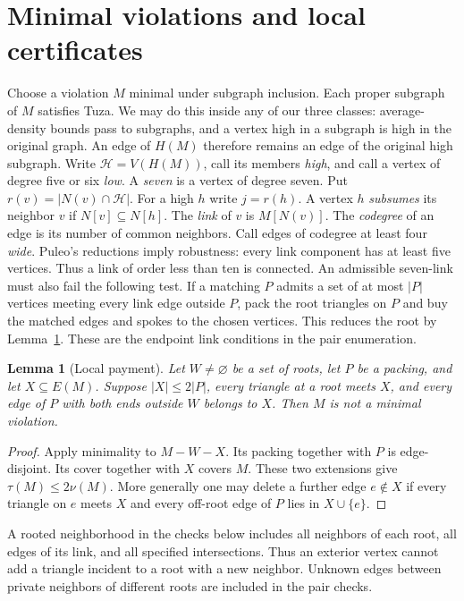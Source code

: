 \documentclass[11pt,a4paper]{amsart}
\newtheorem{lemma}[theorem]{Lemma}
\newcommand{\Hi}{\mathcal H}
\begin{document}
\section{Minimal violations and local certificates}\label{sec:local}
Choose a violation $M$ minimal under subgraph inclusion. Each proper
subgraph of $M$ satisfies Tuza. We may do this inside any of our
three classes: average-density bounds pass to subgraphs, and a
vertex high in a subgraph is high in the original graph. An edge
of $H(M)$ therefore remains an edge of the original high subgraph.
Write $\Hi=V(H(M))$, call its members \emph{high}, and call a vertex
of degree five or six \emph{low}. A \emph{seven} is a vertex of degree
seven. Put $r(v)=|N(v)\cap\Hi|$. For a high $h$ write $j=r(h)$.
A vertex $h$ \emph{subsumes} its neighbor $v$ if $N[v]\subseteq N[h]$.
The \emph{link} of $v$ is $M[N(v)]$. The \emph{codegree} of an edge
is its number of common neighbors. Call edges of codegree at least
four \emph{wide}. Puleo's reductions imply robustness: every link
component has at least five vertices. Thus a link of order less
than ten is connected. An admissible seven-link must also fail
the following test. If a matching $P$ admits a set of at most
$|P|$ vertices meeting every link edge outside $P$, pack the
root triangles on $P$ and buy the
matched edges and spokes to the chosen vertices. This reduces
the root by Lemma~\ref{lem:pay}. These are the endpoint link
conditions in the pair enumeration.

\begin{lemma}[Local payment]\label{lem:pay}
Let $W\ne\varnothing$ be a set of roots, let $P$ be a packing, and
let $X\subseteq E(M)$. Suppose $|X|\le2|P|$, every triangle at a
root meets $X$, and every edge of $P$ with both ends outside $W$
belongs to $X$. Then $M$ is not a minimal violation.
\end{lemma}
\begin{proof}
Apply minimality to $M-W-X$. Its packing together with $P$ is
edge-disjoint. Its cover together with $X$ covers $M$. These two
extensions give $\tau(M)\le2\nu(M)$. More generally one may delete a
further edge $e\notin X$ if every triangle on $e$ meets $X$ and every
off-root edge of $P$ lies in $X\cup\{e\}$.
\end{proof}

A rooted neighborhood in the checks below includes all neighbors of
each root, all edges of its link, and all specified intersections.
Thus an exterior vertex cannot add a triangle incident to a root
with a new neighbor. Unknown edges between private neighbors of
different roots are included in the pair checks.
\end{document}
